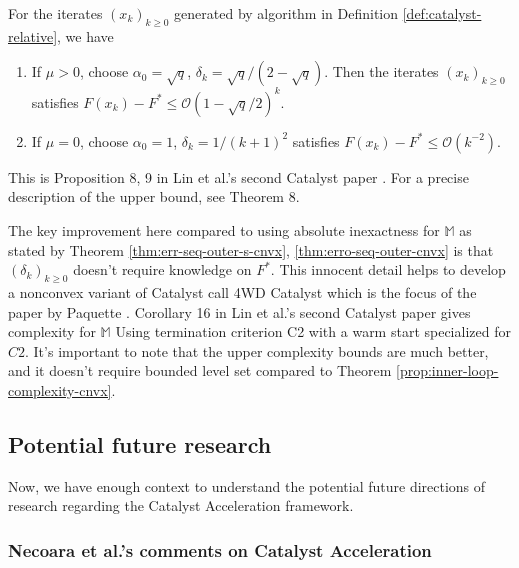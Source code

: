 \documentclass[12pt]{article}
\begin{document}
            \begin{theorem}\label{theorem:catalyst2-outer-loop}
                For the iterates $(x_k)_{k \ge 0}$ generated by algorithm in Definition \ref{def:catalyst-relative}, we have 
                \begin{enumerate}
                    \item If $\mu > 0$, choose $\alpha_0 = \sqrt{q}$, $\delta_k = \sqrt{q}/(2 - \sqrt{q})$. 
                    Then the iterates $(x_k)_{k \ge 0}$ satisfies $F(x_k) - F^* \le \mathcal O\left(1 - \sqrt{q}/2\right)^k$. 
                    \item If $\mu = 0$, choose $\alpha_0 = 1$, $\delta_k = 1/(k + 1)^2$ satisfies $F(x_k) - F^* \le \mathcal O(k^{-2})$. 
                \end{enumerate}
            \end{theorem}
            \begin{remark}
                This is Proposition 8, 9 in Lin et al.'s second Catalyst paper \cite{lin_catalyst_2018}.
                For a precise description of the upper bound, see Theorem 8. 
            \end{remark}
            The key improvement here compared to using absolute inexactness for $\mathbb M$ as stated by Theorem \ref{thm:err-seq-outer-s-cnvx}, \ref{thm:erro-seq-outer-cnvx} is that $(\delta_k)_{k \ge0}$ doesn't require knowledge on $F^*$. 
            This innocent detail helps to develop a nonconvex variant of Catalyst call 4WD Catalyst which is the focus of the paper by Paquette \cite{paquette_catalyst_2018}. 
            Corollary 16 in Lin et al.'s second Catalyst paper \cite{lin_catalyst_2018} gives complexity for $\mathbb M$ Using termination criterion C2 with a warm start specialized for $C2$. 
            It's important to note that the upper complexity bounds are much better, and it doesn't require bounded level set compared to Theorem \ref{prop:inner-loop-complexity-cnvx}.         
    \subsection{Potential future research}\label{ssec:catalyst-future}
        Now, we have enough context to understand the potential future directions of research regarding the Catalyst Acceleration framework. 
        \subsubsection{Necoara et al.'s comments on Catalyst Acceleration}
            
\end{document}

